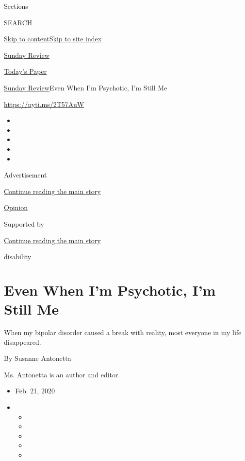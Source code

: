 Sections

SEARCH

\protect\hyperlink{site-content}{Skip to
content}\protect\hyperlink{site-index}{Skip to site index}

\href{https://www.nytimes.com/section/opinion/sunday}{Sunday Review}

\href{https://myaccount.nytimes.com/auth/login?response_type=cookie\&client_id=vi}{}

\href{https://www.nytimes.com/section/todayspaper}{Today's Paper}

\href{/section/opinion/sunday}{Sunday Review}\textbar{}Even When I'm
Psychotic, I'm Still Me

\href{https://nyti.ms/2T57AuW}{https://nyti.ms/2T57AuW}

\begin{itemize}
\item
\item
\item
\item
\item
\end{itemize}

Advertisement

\protect\hyperlink{after-top}{Continue reading the main story}

\href{/section/opinion}{Opinion}

Supported by

\protect\hyperlink{after-sponsor}{Continue reading the main story}

disability

\hypertarget{even-when-im-psychotic-im-still-me}{%
\section{Even When I'm Psychotic, I'm Still
Me}\label{even-when-im-psychotic-im-still-me}}

When my bipolar disorder caused a break with reality, most everyone in
my life disappeared.

By Susanne Antonetta

Ms. Antonetta is an author and editor.

\begin{itemize}
\item
  Feb. 21, 2020
\item
  \begin{itemize}
  \item
  \item
  \item
  \item
  \item
  \end{itemize}
\end{itemize}


